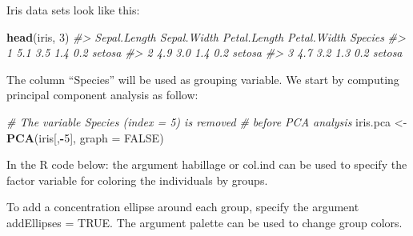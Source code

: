 \documentclass[]{book}
\newenvironment{Shaded}{\begin{snugshade}}{\end{snugshade}}
\newcommand{\CommentTok}[1]{\textcolor[rgb]{0.56,0.35,0.01}{\textit{#1}}}
\newcommand{\DataTypeTok}[1]{\textcolor[rgb]{0.13,0.29,0.53}{#1}}
\newcommand{\DecValTok}[1]{\textcolor[rgb]{0.00,0.00,0.81}{#1}}
\newcommand{\KeywordTok}[1]{\textcolor[rgb]{0.13,0.29,0.53}{\textbf{#1}}}
\newcommand{\NormalTok}[1]{#1}
\newcommand{\OperatorTok}[1]{\textcolor[rgb]{0.81,0.36,0.00}{\textbf{#1}}}
\newcommand{\OtherTok}[1]{\textcolor[rgb]{0.56,0.35,0.01}{#1}}
\newcommand{\StringTok}[1]{\textcolor[rgb]{0.31,0.60,0.02}{#1}}
\begin{document}
Iris data sets look like this:

\begin{Shaded}
\begin{Highlighting}[]
\KeywordTok{head}\NormalTok{(iris, }\DecValTok{3}\NormalTok{)}
\CommentTok{#>   Sepal.Length Sepal.Width Petal.Length Petal.Width Species}
\CommentTok{#> 1          5.1         3.5          1.4         0.2  setosa}
\CommentTok{#> 2          4.9         3.0          1.4         0.2  setosa}
\CommentTok{#> 3          4.7         3.2          1.3         0.2  setosa}
\end{Highlighting}
\end{Shaded}

The column ``Species'' will be used as grouping variable. We start by computing principal component analysis as follow:

\begin{Shaded}
\begin{Highlighting}[]
\CommentTok{# The variable Species (index = 5) is removed}
\CommentTok{# before PCA analysis}
\NormalTok{iris.pca <-}\StringTok{ }\KeywordTok{PCA}\NormalTok{(iris[,}\OperatorTok{-}\DecValTok{5}\NormalTok{], }\DataTypeTok{graph =} \OtherTok{FALSE}\NormalTok{)}
\end{Highlighting}
\end{Shaded}

In the R code below: the argument habillage or col.ind can be used to specify the factor variable for coloring the individuals by groups.

To add a concentration ellipse around each group, specify the argument addEllipses = TRUE. The argument palette can be used to change group colors.

\begin{Shaded}
\end{Shaded}
\end{document}
